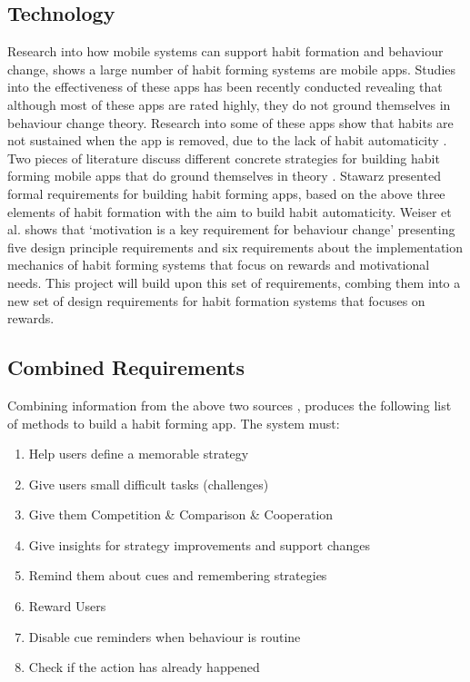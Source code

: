 \subsection{Technology}
Research into how mobile systems can support habit formation and behaviour change, shows a large number of habit forming systems are mobile apps. Studies into the effectiveness of these apps has been recently conducted \cite{article_beyond_self_tracking_designing_apps, article_dont_kick_habit} revealing that although most of these apps are rated highly, they do not ground themselves in behaviour change theory. Research into some of these apps show that habits are not sustained when the app is removed, due to the lack of habit automaticity \cite{article_beyond_self_tracking_designing_apps}.\newline
\newline
Two pieces of literature discuss different concrete strategies for building habit forming mobile apps that do ground themselves in theory \cite{thesis_kathy, article_taxonomy_motivational_affordances_meaningful}. Stawarz \cite{thesis_kathy} presented formal requirements for building habit forming apps, based on the above three elements of habit formation with the aim to build habit automaticity. Weiser et al. \cite{article_taxonomy_motivational_affordances_meaningful} shows that `motivation is a key requirement for behaviour change' presenting five design principle requirements and six requirements about the implementation mechanics of habit forming systems that focus on rewards and motivational needs. This project will build upon this set of requirements, combing them into a new set of design requirements for habit formation systems that focuses on rewards.

\subsection{Combined Requirements}
Combining information from the above two sources \cite{thesis_kathy, article_taxonomy_motivational_affordances_meaningful}, produces the following list of methods to build a habit forming app.\newline
\newline
The system must:

\begin{enumerate}
  \item Help users define a memorable strategy
  \item Give users small difficult tasks (challenges)
  \item Give them Competition \& Comparison \& Cooperation
  \item Give insights for strategy improvements and support changes
  \item Remind them about cues and remembering strategies
  \item Reward Users
  \item Disable cue reminders when behaviour is routine
  \item Check if the action has already happened
\end{enumerate}

